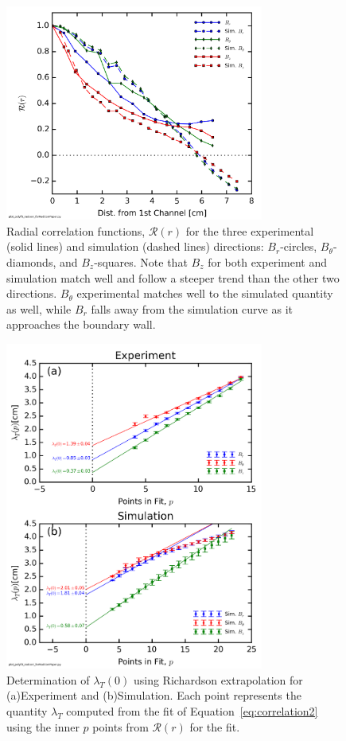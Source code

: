 \documentclass[aps,prl,amsmath,amssymb,reprint,superscriptaddress]{revtex4-1} %
\begin{document}
\begin{figure}[!htbp]
\centering
\includegraphics[width=8.5cm]{Exp1mWb_vsSim_wdetrend.png}
\caption{\label{fig:comparisons}Radial correlation functions, $\mathcal{R}(r)$ for the three experimental (solid lines) and simulation (dashed lines) directions: $B_r$-circles, $B_{\theta}$-diamonds, and $B_z$-squares. Note that $B_z$ for both experiment and simulation match well and follow a steeper trend than the other two directions. $B_{\theta}$ experimental matches well to the simulated quantity as well, while $B_r$ falls away from the simulation curve as it approaches the boundary wall.}
\end{figure}

\begin{figure}[!htbp]
\centerline{
\includegraphics[width=8.5cm]{RichardsonExtrap_BrBtBz_1mWb_wdetrend.png}}
\caption{\label{fig:extrap} Determination of $\lambda_T(0)$ using Richardson extrapolation for (a)Experiment and (b)Simulation. Each point represents the quantity $\lambda_{T}$ computed from the fit of Equation~\ref{eq:correlation2} using the inner $p$ points from $\mathcal{R}(r)$ for the fit.}
\end{figure}
\end{document}
